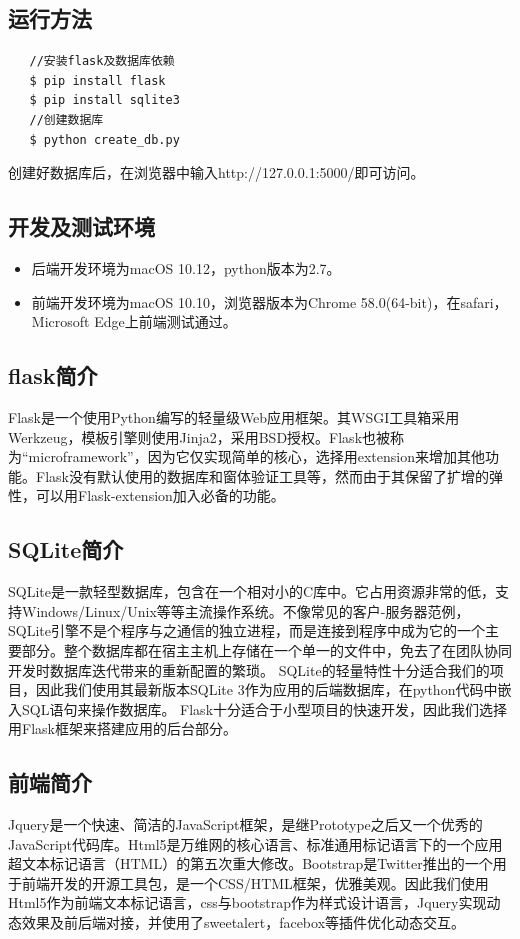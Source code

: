 \documentclass[12pt, oneside,a4paper]{article}
\begin{document}
\subsection{运行方法}
\begin{lstlisting}
   //安装flask及数据库依赖
   $ pip install flask
   $ pip install sqlite3
   //创建数据库
   $ python create_db.py
   \end{lstlisting}
创建好数据库后，在浏览器中输入http://127.0.0.1:5000/即可访问。
\subsection{开发及测试环境}
\begin{itemize}
\item 后端开发环境为macOS 10.12，python版本为2.7。
\item 前端开发环境为macOS 10.10，浏览器版本为Chrome 58.0(64-bit)，在safari，Microsoft Edge上前端测试通过。
\end{itemize}
\subsection{flask简介}
Flask是一个使用Python编写的轻量级Web应用框架。其WSGI工具箱采用Werkzeug，模板引擎则使用Jinja2，采用BSD授权。Flask也被称为“microframework”，因为它仅实现简单的核心，选择用extension来增加其他功能。Flask没有默认使用的数据库和窗体验证工具等，然而由于其保留了扩增的弹性，可以用Flask-extension加入必备的功能。
\subsection{SQLite简介}
SQLite是一款轻型数据库，包含在一个相对小的C库中。它占用资源非常的低，支持Windows/Linux/Unix等等主流操作系统。不像常见的客户-服务器范例，SQLite引擎不是个程序与之通信的独立进程，而是连接到程序中成为它的一个主要部分。整个数据库都在宿主主机上存储在一个单一的文件中，免去了在团队协同开发时数据库迭代带来的重新配置的繁琐。
SQLite的轻量特性十分适合我们的项目，因此我们使用其最新版本SQLite 3作为应用的后端数据库，在python代码中嵌入SQL语句来操作数据库。
Flask十分适合于小型项目的快速开发，因此我们选择用Flask框架来搭建应用的后台部分。
\subsection{前端简介}
Jquery是一个快速、简洁的JavaScript框架，是继Prototype之后又一个优秀的JavaScript代码库。Html5是万维网的核心语言、标准通用标记语言下的一个应用超文本标记语言（HTML）的第五次重大修改。Bootstrap是Twitter推出的一个用于前端开发的开源工具包，是一个CSS/HTML框架，优雅美观。因此我们使用Html5作为前端文本标记语言，css与bootstrap作为样式设计语言，Jquery实现动态效果及前后端对接，并使用了sweetalert，facebox等插件优化动态交互。
\end{document}
